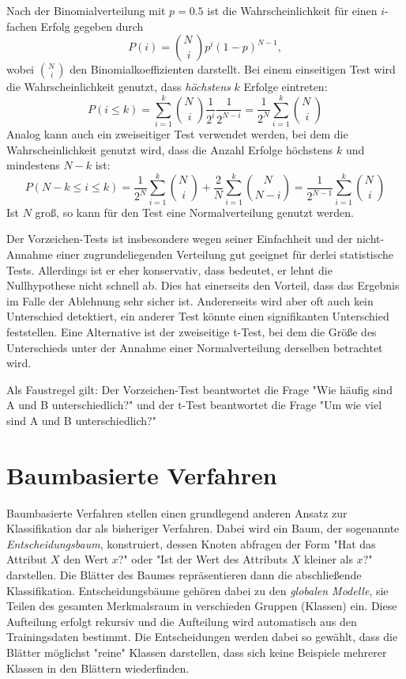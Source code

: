 		Nach der Binomialverteilung mit \(p = 0.5\) ist die Wahrscheinlichkeit für einen \(i\)-fachen Erfolg gegeben durch
		\begin{equation}
			P(i) = {N\, \choose i} p^i (1 - p)^{N - 1},
		\end{equation}
		wobei \( N\, \choose i \) den Binomialkoeffizienten darstellt. Bei einem einseitigen Test wird die Wahrscheinlichkeit genutzt, dass \emph{höchstens} \(k\) Erfolge eintreten:
		\begin{equation}
			P(i \leq k) = \sum_{i = 1}^{k} {N\, \choose i} \frac{1}{2^i} \frac{1}{2^{N - i}} = \frac{1}{2^N} \sum_{i = 1}^{k} {N\, \choose i}
		\end{equation}
		Analog kann auch ein zweiseitiger Test verwendet werden, bei dem die Wahrscheinlichkeit genutzt wird, dass die Anzahl Erfolge höchstens \(k\) und mindestens \(N - k\) ist:
		\begin{equation}
			P(N - k \leq i \leq k) = \frac{1}{2^N} \sum_{i = 1}^{k} {N\, \choose i} + \frac{2}{N} \sum_{i = 1}^{k} {N \choose N - i} = \frac{1}{2^{N - 1}} \sum_{i = 1}^{k} {N\, \choose i}
		\end{equation}
		Ist \(N\) groß, so kann für den Test eine Normalverteilung genutzt werden.

		Der Vorzeichen-Tests ist insbesondere wegen seiner Einfachheit und der nicht-Annahme einer zugrundeliegenden Verteilung gut geeignet für derlei statistische Tests. Allerdings ist er eher konservativ, dass bedeutet, er lehnt die Nullhypothese nicht schnell ab. Dies hat einerseits den Vorteil, dass das Ergebnis im Falle der Ablehnung sehr sicher ist. Andererseits wird aber oft auch kein Unterschied detektiert, \dh ein anderer Test könnte einen signifikanten Unterschied feststellen. Eine Alternative ist der zweiseitige t-Test, bei dem die Größe des Unterschieds unter der Annahme einer Normalverteilung derselben betrachtet wird.

		Als Faustregel gilt: Der Vorzeichen-Test beantwortet die Frage "Wie häufig sind A und B unterschiedlich?" und der t-Test beantwortet die Frage "Um wie viel sind A und B unterschiedlich?"

\chapter{Baumbasierte Verfahren}
	\label{c:trees}

	Baumbasierte Verfahren stellen einen grundlegend anderen Ansatz zur Klassifikation dar als bisheriger Verfahren. Dabei wird ein Baum, der sogenannte \emph{Entscheidungsbaum}, konstruiert, dessen Knoten abfragen der Form "Hat das Attribut \(X\) den Wert \(x\)?" oder "Ist der Wert des Attributs \(X\) kleiner als \(x\)?" darstellen. Die Blätter des Baumes repräsentieren dann die abschließende Klassifikation. Entscheidungsbäume gehören dabei zu den \emph{globalen Modelle}, \dh sie Teilen des gesamten Merkmalsraum in verschieden Gruppen (Klassen) ein. Diese Aufteilung erfolgt rekursiv und die Aufteilung wird automatisch aus den Trainingsdaten bestimmt. Die Entscheidungen werden dabei so gewählt, dass die Blätter möglichst "reine" Klassen darstellen, \dh dass sich keine Beispiele mehrerer Klassen in den Blättern wiederfinden.

